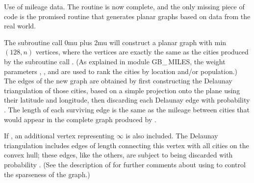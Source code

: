 Use of mileage data. The  routine is now complete,
and the
only missing piece of code is the promised routine that generates
planar graphs based on data from the real world.

The subroutine call {\advance\thinmuskip 0mu plus 2mu
}
will construct a planar graph with min$(128,n)$ vertices, where the
vertices are exactly the same as the cities produced by the subroutine call
. (As
explained in module {\sc GB\_\,MILES}, the weight parameters ,
, and  are used to rank the cities by
location and/or population.)  The edges of the new graph are obtained
by first constructing the Delaunay triangulation of those cities,
based on a simple projection onto the plane using their latitude and
longitude, then discarding each Delaunay edge with probability
. The length of each surviving edge is the same as the
mileage between cities that would appear in the complete graph
produced by .

If , an additional vertex representing $\infty$ is also
included. The Delaunay triangulation includes edges of length 
connecting this vertex with all cities on the convex hull; these edges,
like the others, are subject to being discarded with probability .
(See the description of  for further comments about using
 to control the sparseness of the graph.)

